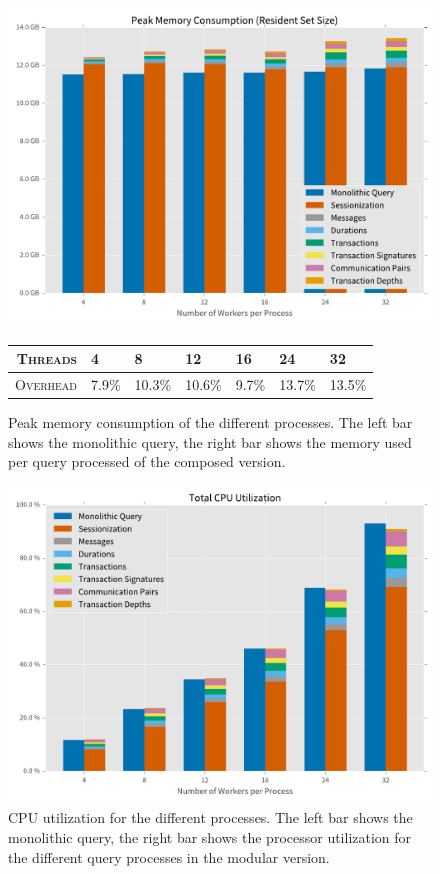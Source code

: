\begin{figure}[p]
  \centering
    \includegraphics[width=1\textwidth]{figures/evaluation/rss}

    {\footnotesize
    \vspace{1em}
    \begin{tabularx}{\textwidth}{ rXXXXXX }
      \hline 
      \textsc{Threads} & 4 & 8 & 12 & 16 & 24 & 32 \\
      \hline 
      \textsc{Overhead} & 7.9\%&10.3\%&10.6\%&9.7\%&13.7\%&13.5\%\\
      \hline
    \end{tabularx}
    }
    \caption[Peak memory consumption]{Peak memory consumption of the different
    processes. The left bar shows the monolithic query, the right bar shows the memory
    used per query processed of the composed version.}
    \label{fig:rss}
\end{figure}

\begin{figure}[p]
  \centering
    \includegraphics[width=1\textwidth]{figures/evaluation/cpu_tot}
    \caption[Total CPU utilization]{CPU utilization for the different
    processes. The left bar shows the monolithic query, the right bar shows the
    processor utilization for the different query processes in the modular version.}
    \label{fig:cpu}
\end{figure}
\clearpage
